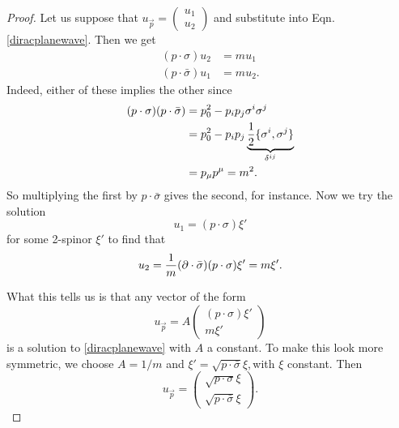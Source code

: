 \begin{proof}
Let us suppose that $u_{\vec p}=\begin{pmatrix}u_1\\u_2\end{pmatrix}$ and substitute into Eqn. \ref{diracplanewave}. Then we get
\begin{align}
    (p\cdot \sigma)u_2 &= m u_1\\
    (p\cdot \bar \sigma)u_1 &= m u_2.
\end{align}
Indeed, either of these implies the other since
\begin{align*}
    (p\cdot \sigma)(p\cdot \bar \sigma) &= p_0^2 -p_i p_j \sigma^i \sigma^j\\
    &= p_0^2 -p_i p_j \underbrace{\frac{1}{2}\{\sigma^i,\sigma^j\}}_{\delta^{ij}}\\
    &=p_\mu p^\mu = m^2.
\end{align*}
So multiplying the first by $p\cdot \bar \sigma$ gives the second, for instance. Now we try the solution
$$u_1=(p\cdot \sigma)\xi'$$ for some 2-spinor $\xi'$ to find that
$$u_2=\frac{1}{m}(\partial \cdot \bar \sigma)(p\cdot \sigma)\xi' = m\xi'.$$

What this tells us is that any vector of the form
$$u_{\vec p} =A \begin{pmatrix}
(p\cdot \sigma)\xi'\\ m \xi'
\end{pmatrix}$$
is a solution to \ref{diracplanewave} with $A$ a constant. To make this look more symmetric, we choose $A=1/m$ and $\xi'=\sqrt{p\cdot \bar \sigma}\xi,$with $\xi$ constant. Then
$$u_{\vec p}=\begin{pmatrix}\sqrt{p\cdot \sigma}\xi\\
\sqrt{p\cdot \bar \sigma}\xi
\end{pmatrix}.$$
\end{proof}

